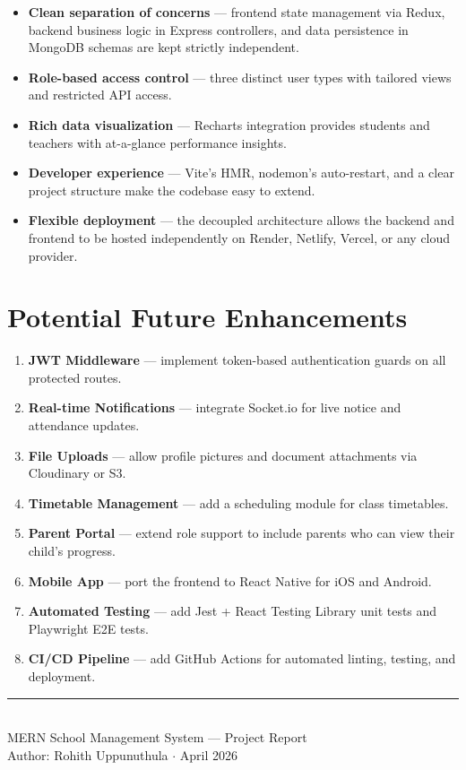 \documentclass[12pt,a4paper]{report}
\begin{document}
\begin{itemize}[leftmargin=2em]
  \item \textbf{Clean separation of concerns} --- frontend state management via Redux, backend business logic in Express controllers, and data persistence in MongoDB schemas are kept strictly independent.
  \item \textbf{Role-based access control} --- three distinct user types with tailored views and restricted API access.
  \item \textbf{Rich data visualization} --- Recharts integration provides students and teachers with at-a-glance performance insights.
  \item \textbf{Developer experience} --- Vite's HMR, nodemon's auto-restart, and a clear project structure make the codebase easy to extend.
  \item \textbf{Flexible deployment} --- the decoupled architecture allows the backend and frontend to be hosted independently on Render, Netlify, Vercel, or any cloud provider.
\end{itemize}

\section{Potential Future Enhancements}

\begin{enumerate}[leftmargin=2em]
  \item \textbf{JWT Middleware} --- implement token-based authentication guards on all protected routes.
  \item \textbf{Real-time Notifications} --- integrate Socket.io for live notice and attendance updates.
  \item \textbf{File Uploads} --- allow profile pictures and document attachments via Cloudinary or S3.
  \item \textbf{Timetable Management} --- add a scheduling module for class timetables.
  \item \textbf{Parent Portal} --- extend role support to include parents who can view their child's progress.
  \item \textbf{Mobile App} --- port the frontend to React Native for iOS and Android.
  \item \textbf{Automated Testing} --- add Jest + React Testing Library unit tests and Playwright E2E tests.
  \item \textbf{CI/CD Pipeline} --- add GitHub Actions for automated linting, testing, and deployment.
\end{enumerate}

\vfill
\begin{center}
  \rule{0.5\linewidth}{0.4pt}\\[0.3cm]
  {\small\color{codegray}
    MERN School Management System --- Project Report\\
    Author: Rohith Uppunuthula $\cdot$ April 2026
  }
\end{center}
\end{document}
